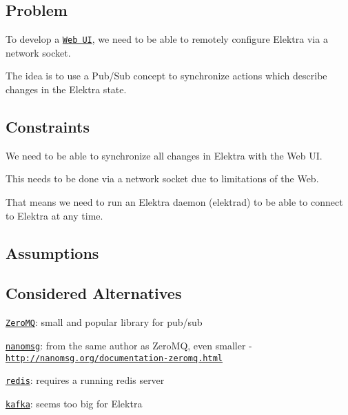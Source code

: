 \subsection*{Problem}

To develop a \href{https://github.com/ElektraInitiative/libelektra/issues/252}{\tt Web UI}, we need to be able to remotely configure Elektra via a network socket.

The idea is to use a Pub/\+Sub concept to synchronize actions which describe changes in the Elektra state.

\subsection*{Constraints}


\begin{DoxyItemize}
\item We need to be able to synchronize all changes in Elektra with the Web UI.
\item This needs to be done via a network socket due to limitations of the Web.
\item That means we need to run an Elektra daemon ({\ttfamily elektrad}) to be able to connect to Elektra at any time.
\end{DoxyItemize}

\subsection*{Assumptions}

\subsection*{Considered Alternatives}


\begin{DoxyItemize}
\item \href{http://zeromq.org/}{\tt Zero\+MQ}\+: small and popular library for pub/sub
\item \href{http://nanomsg.org/}{\tt nanomsg}\+: from the same author as Zero\+MQ, even smaller -\/ \href{http://nanomsg.org/documentation-zeromq.html}{\tt http\+://nanomsg.\+org/documentation-\/zeromq.\+html}
\item \href{http://redis.io/topics/pubsub}{\tt redis}\+: requires a running redis server
\item \href{http://kafka.apache.org/}{\tt kafka}\+: seems too big for Elektra
\end{DoxyItemize}

